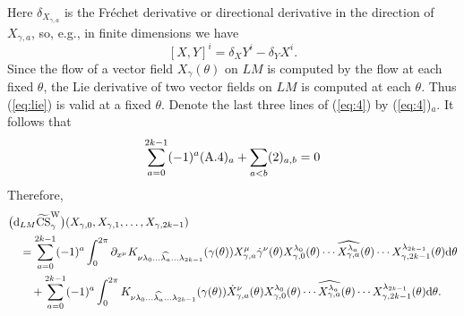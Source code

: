 \documentclass[10pt,a4paper]{amsart}
\numberwithin{equation}{section}
\theoremstyle{definition}
\newcommand{\bm}{ M}
\newcommand{\ocs}{\widetilde{{\rm CS}}}
\begin{document}
Here $\delta_{X_{\gamma,a}}$ is the Fr\'echet derivative or directional derivative in the direction of $X_{\gamma,a}$, so, e.g., in finite dimensions we have
\begin{equation}\label{eq:lie}[X,Y]^i = \delta_XY^i - \delta_YX^i.
\end{equation}
 Since the flow of a vector field $X_\gamma(\theta)$ on $LM$ is computed by the flow at each fixed $\theta$, the Lie derivative of two vector fields on $LM$ is computed at each $\theta$.
Thus (\ref{eq:lie}) is valid at a fixed $\theta$. Denote the last three lines of (\ref{eq:4}) by (\ref{eq:4})${}_a$. It follows that
\begin{equation*}
 \sum_{a=0}^{2k-1} (-1)^a ({\rm A.4})_a
 + \sum_{a<b} (2)_{a,b} =0
\end{equation*}
Therefore,
\begin{align*}
&\bigl( {\rm d}_{L\bm} \ocs^{\rm W}_\gamma \bigr)
 (X_{\gamma ,0}, X_{\gamma ,1},\dots, X_{\gamma ,2k-1} ) \\
&\quad= \sum_{a=0}^{2k-1} (-1)^a
\int_{0}^{2\pi}
 \partial_{x^\mu} K_{\nu \lambda_0 \dots \widehat{\lambda_a}\dots\lambda_{2k-1}}
(\gamma(\theta))
X_{\gamma, a}^{\mu} \dot{\gamma}^\nu (\theta)
X_{\gamma ,0}^{\lambda_0 } (\theta)
\cdots \widehat{X_{\gamma ,a}^{\lambda_a}}(\theta)\cdots
X_{\gamma ,2k-1}^{\lambda_{2k-1} } (\theta)
 {\rm d}\theta \nonumber\\
&\qquad{} +\sum_{a=0}^{2k-1} (-1)^a
\int_{0}^{2\pi}
K_{\nu \lambda_0 \dots \widehat{\lambda_a}\dots \lambda_{2k-1}} (\gamma (\theta) )
\dot{X}_{\gamma ,a}^\nu (\theta )
X_{\gamma ,0}^{\lambda_0 } (\theta)
\cdots\widehat{X_{\gamma ,a}^{\lambda_a}}(\theta) \cdots
X_{\gamma ,2k-1}^{\lambda_{2k-1} } (\theta) {\rm d}\theta.
\end{align*}
\end{document}
